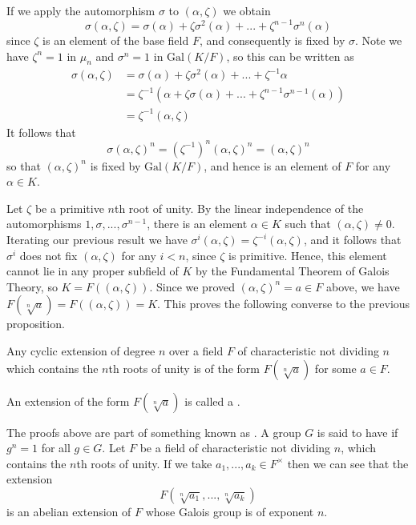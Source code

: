If we apply the automorphism $\sigma$ to $(\alpha,\zeta)$ we obtain\begin{equation*}
    \sigma(\alpha,\zeta) = \sigma(\alpha)+\zeta\sigma^2(\alpha)+...+\zeta^{n-1}\sigma^n(\alpha)
\end{equation*}
since $\zeta$ is an element of the base field $F$, and consequently is fixed by $\sigma$. Note we have $\zeta^n = 1$ in $\mu_n$ and $\sigma^n = 1$ in $\text{Gal}(K/F)$, so this can be written as \begin{align*}
    \sigma(\alpha,\zeta) &= \sigma(\alpha)+\zeta\sigma^2(\alpha)+...+\zeta^{-1}\alpha \\
    &= \zeta^{-1}(\alpha+\zeta\sigma(\alpha)+...+\zeta^{n-1}\sigma^{n-1}(\alpha)) \\
    &= \zeta^{-1}(\alpha,\zeta)
\end{align*}
It follows that \begin{equation*}
    \sigma(\alpha,\zeta)^n = (\zeta^{-1})^n(\alpha,\zeta)^n = (\alpha,\zeta)^n
\end{equation*}
so that $(\alpha,\zeta)^n$ is fixed by $\text{Gal}(K/F)$, and hence is an element of $F$ for any $\alpha \in K$.

Let $\zeta$ be a primitive $n$th root of unity. By the linear independence of the automorphisms $1,\sigma,...,\sigma^{n-1}$, there is an element $\alpha \in K$ such that $(\alpha,\zeta)\neq 0$. Iterating our previous result we have $\sigma^i(\alpha,\zeta) = \zeta^{-i}(\alpha,\zeta)$, and it follows that $\sigma^i$ does not fix $(\alpha,\zeta)$ for any $i < n$, since $\zeta$ is primitive. Hence, this element cannot lie in any proper subfield of $K$ by the Fundamental Theorem of Galois Theory, so $K = F((\alpha,\zeta))$. Since we proved $(\alpha,\zeta)^n = a \in F$ above, we have $F(\sqrt[n]{a}) = F((\alpha,\zeta)) = K$. This proves the following converse to the previous proposition.

\begin{proposition}\label{prop:cyclicimpliesrad}
    Any cyclic extension of degree $n$ over a field $F$ of characteristic not dividing $n$ which contains the $n$th roots of unity is of the form $F(\sqrt[n]{a})$ for some $a \in F$.
\end{proposition}

An extension of the form $F(\sqrt[n]{a})$ is called a . 

\begin{remark}
    The proofs above are part of something known as . A group $G$ is said to have  if $g^n = 1$ for all $g \in G$. Let $F$ be a field of characteristic not dividing $n$, which contains the $n$th roots of unity. If we take $a_1,...,a_k \in F^{\times}$ then we can see that the extension \begin{equation*}
        F(\sqrt[n]{a_1},...,\sqrt[n]{a_k})
    \end{equation*}
    is an abelian extension of $F$ whose Galois group is of exponent $n$.
\end{remark}


